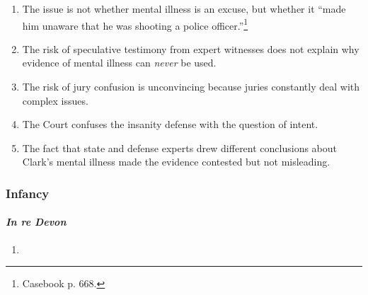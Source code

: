 \begin{enumerate}
\begin{enumerate}
        \item The issue is not whether mental illness is an excuse, but whether it ``made him unaware that he was shooting a police officer.''\footnote{Casebook p. 668.}
        \item The risk of speculative testimony from expert witnesses does not explain why evidence of mental illness can \emph{never} be used.
        \item The risk of jury confusion is unconvincing because juries constantly deal with complex issues.
        \item The Court confuses the insanity defense with the question of intent.
        \item The fact that state and defense experts drew different conclusions about Clark's mental illness made the evidence contested but not misleading.
    \end{enumerate}
\end{enumerate}

\subsubsection{Infancy}

\paragraph{\emph{In re Devon}}

\begin{enumerate}
    \item 
\end{enumerate}
